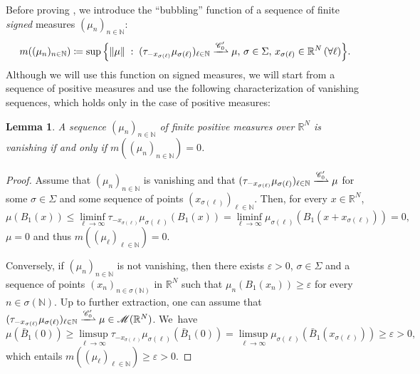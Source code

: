 \documentclass[JEP,XML,SOM,Unicode,published]{cedram}
\theoremstyle{plain}
\newtheorem{lemma}[theorem]{Lemma}
\theoremstyle{definition}
\newcommand{\N}{\mathbb{N}}
\newcommand{\R}{\mathbb{R}}
\newcommand{\Cspace}{\mathscr{C}}
\newcommand{\Mspace}{\mathscr{M}}
\newcommand{\eps}{\varepsilon}
\newcommand{\st}{\;:\;}
\DeclarePairedDelimiter{\norm}{\lVert}{\rVert}
\newcommand{\mweakto}{\xrightharpoonup{\Cspace_0'}}
\begin{document}
Before proving , we introduce the \enquote{bubbling} function of a sequence of finite \emph{signed} measures \((\mu_n)_{n\in\N}\):\vspace*{-3pt}
\begin{equation}
m((\mu_n)_{n\in\N})\coloneqq\sup\Big\{ \norm{\mu} \st (\tau_{-x_{\sigma(\ell)}}\mu_{\sigma(\ell)})_{\ell\in\N} \mweakto \mu,\, \sigma \in \Sigma,\, x_{\sigma(\ell)} \in \R^N\, (\forall \ell) \Big\}.
\end{equation}
Although we will use this function on signed measures, we will start from a sequence of positive measures and use the following characterization of vanishing sequences, which holds only in the case of positive measures:
\begin{lemma}\label{concentrationProperties}
A sequence \((\mu_n)_{n\in\N}\) of finite positive measures over $\R^N$ is vanishing if and only if \(m((\mu_n)_{n\in\N})=0\).
\end{lemma}
\begin{proof}
Assume that \((\mu_n)_{n\in\N}\) is vanishing and that \((\tau_{-x_{\sigma(\ell)}}\mu_{\sigma(\ell)})_{\ell\in\N} \mweakto \mu\) for some \(\sigma \in \Sigma\) and some sequence of points \((x_{\sigma(\ell)})_{\ell\in\N}\). Then, for every \(x\in\R^N\),\vspace*{-3pt}
\[
\mu(B_1(x))\le\liminf_{\ell\to\infty}\tau_{-x_{\sigma(\ell)}}\mu_{\sigma(\ell)}(B_1(x))=\liminf_{\ell\to\infty}\mu_{\sigma(\ell)}(B_1(x+x_{\sigma(\ell)}))=0,
\]
\ie \(\mu=0\) and thus \(m((\mu_\ell)_{\ell\in\N})=0\).

Conversely, if \((\mu_n)_{n\in\N}\) is not vanishing, then there exists \(\eps>0\), \(\sigma\in\Sigma\) and a sequence of points \((x_n)_{n\in\sigma(\N)}\) in \(\R^N\) such that \(\mu_n(B_1(x_n))\ge\eps\) for every \(n\in\sigma(\N)\). Up to further extraction, one can assume that \((\tau_{-x_{\sigma(\ell)}}\mu_{\sigma(\ell)})_{\ell\in\N} \mweakto\mu\in\Mspace(\R^N)\). We~have\vspace*{-3pt}
\[
\mu(\bar B_1(0))\ge\limsup_{\ell\to\infty}\tau_{-x_{\sigma(\ell)}}\mu_{\sigma(\ell)}(\bar B_1(0))=\limsup_{\ell\to\infty}\mu_{\sigma(\ell)}(\bar B_1(x_{\sigma(\ell)}))\ge\eps>0,
\]
which entails \(m((\mu_\ell)_{\ell\in\N})\ge\eps>0\).
\end{proof}
\end{document}
